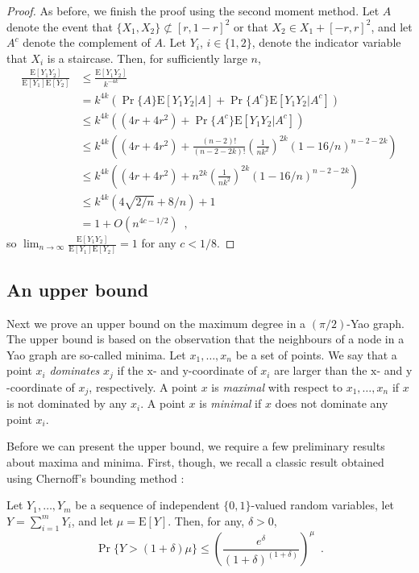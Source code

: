 \documentclass[lotsofwhite,charterfonts]{patmorin}
\newcommand{\PROB}{\Pr}
\newcommand{\EXP}{\mathrm{E}}
\begin{document}
\begin{proof}
As before, we finish the proof using the second moment method.  Let $A$
denote the event that $\{X_1,X_2\}\not\subset[r,1-r]^2$ or that $X_2\in
X_1+[-r,r]^2$, and let $A^c$ denote the complement of $A$.  Let $Y_i$,
$i\in\{1,2\}$, denote the indicator variable that $X_i$ is a staircase.
Then, for sufficiently large $n$,
\[
  \begin{aligned}
    \frac{\EXP[Y_1Y_2]}{\EXP[Y_1]\EXP[Y_2]}
      & \le \frac{\EXP[Y_1Y_2]}{k^{-4k}} \\
      & = k^{4k} (\PROB\{A\}\EXP[Y_1Y_2|{A}]
             +\PROB\{A^c\}\EXP[Y_1Y_2|A^c]) \\
      & \le k^{4k} ((4r+4r^2) + \Pr\{A^c\}\EXP[Y_1Y_2|A^c]) \\
      & \le k^{4k} \left((4r+4r^2) + \frac{(n-2)!}{(n-2-2k)!}\left(\frac{1}{nk^2}\right)^{2k}(1-16/n)^{n-2-2k}\right) \\
      & \le k^{4k} \left((4r+4r^2) + n^{2k}\left(\frac{1}{nk^2}\right)^{2k}(1-16/n)^{n-2-2k}\right) \\
      & \le k^{4k}\left(4\sqrt{2/n}+ 8/n\right) + 1  \\
      & = 1 + O(n^{4c-1/2}) \enspace ,
  \end{aligned}
\]
so $\lim_{n\rightarrow\infty} \frac{\EXP[Y_1Y_2]}{\EXP[Y_1]\EXP[Y_2]} = 1$
for any $c<1/8$.
\end{proof}

\subsection{An upper bound}

Next we prove an upper bound on the maximum degree in a $(\pi/2)$-Yao graph.
The upper bound is based on the observation that the neighbours of a node
in a Yao graph are so-called minima.  Let $x_1,\ldots,x_n$ be a set of
points. We say that a point $x_i$ \emph{dominates} $x_j$ if the
$\mathrm{x}$- and $\mathrm{y}$-coordinate of $x_i$ are larger than the
$\mathrm{x}$- and $\mathrm{y}$-coordinate of $x_j$, respectively.  A point
$x$ is \emph{maximal} with respect to $x_1,\ldots,x_n$ if $x$ is not
dominated by any $x_i$.  A point $x$ is \emph{minimal} if $x$ does not
dominate any point $x_i$.

Before we can present the upper bound, we require a few preliminary results
about maxima and minima.  First, though, we recall a classic result 
obtained using Chernoff's bounding method \cite{c52}:

\begin{lem}
Let $Y_1,\ldots,Y_m$ be a sequence of independent $\{0,1\}$-valued
random variables, let $Y=\sum_{i=1}^m Y_i$, and let $\mu=\EXP[Y]$.
Then, for any, $\delta > 0$,
\[
   \Pr\{Y > (1+\delta)\mu\} 
     \le \left(\frac{e^{\delta}}{(1+\delta)^{(1+\delta)}}\right)^{\mu}
	\enspace .
\]
\end{lem}
\end{document}
